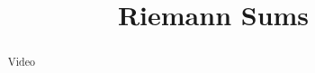 \documentclass[handout]{ximera}
\title{Riemann Sums}
\begin{document}
\begin{abstract} Video %
\end{abstract}

\maketitle

\end{document}
